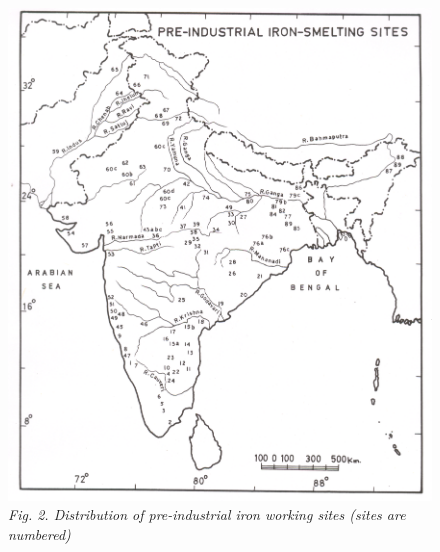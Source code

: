 \begin{figure}[H]
\includegraphics[scale=0.47]{images/chapter-1/fig003.jpg}
\caption{\textit{Fig. 2. Distribution of pre-industrial iron working sites (sites are numbered)}}\label{chapter1-fig003}
\end{figure}

